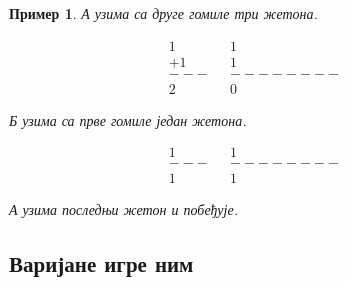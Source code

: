 \documentclass[a4paper]{article}
\newtheorem{example}{Пример}
\begin{document}
\begin{example}
	\textit{А} узима са друге гомиле три жетона.
	
	\begin{align*}
		1&		&       1&\\
		+1&		&  	  	1&\\
		---&	&--------&\\
		2&		&       0
	\end{align*}
	
	\textit{Б} узима са прве гомиле један жетона.
	
	\begin{align*}
		1&		&  	  	1&\\
		---&	&--------&\\
		1&		&       1
	\end{align*}
	
	\textit{А} узима последњи жетон и побеђује.
	
\end{example}

\subsection{Варијане игре ним}
\label{subsec:varijante_igre_nim}
\end{document}
